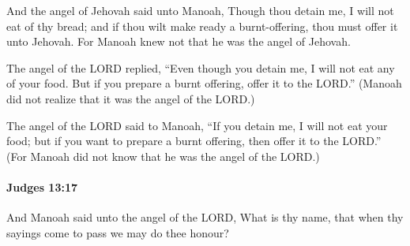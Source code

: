 			\begin{versebox}
					\item[BHS] 
					\item[ASV] And the angel of Jehovah said unto Manoah, Though thou detain me, I will not eat of thy bread; and if thou wilt make ready a burnt-offering, thou must offer it unto Jehovah. For Manoah knew not that he was the angel of Jehovah.
					\item[NIV] The angel of the LORD replied, “Even though you detain me, I will not eat any of your food. But if you prepare a burnt offering, offer it to the LORD.” (Manoah did not realize that it was the angel of the LORD.)
					\item[NRSV] The angel of the LORD said to Manoah, “If you detain me, I will not eat your food; but if you want to prepare a burnt offering, then offer it to the LORD.” (For Manoah did not know that he was the angel of the LORD.)
			\end{versebox}

		\paragraph{Judges 13:17} %
			\label{JUDGES-13-17}

			And Manoah said unto the angel of the LORD, What is thy name, that when thy sayings come to pass we may do thee honour?

